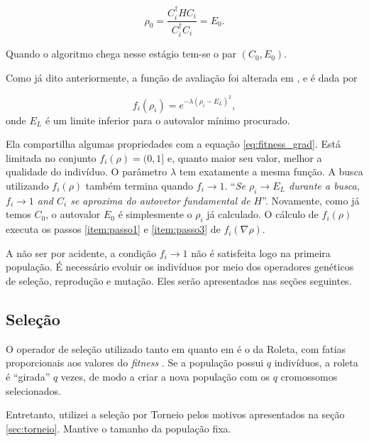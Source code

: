 	\begin{equation}
		\rho_0 = \frac{C_i^{\dagger} H C_i}{C_i^{\dagger} C_i} = E_0.
	\end{equation}
	
	Quando o algoritmo chega nesse estágio tem-se o par $(C_0,E_0)$.
	
	Como já dito anteriormente, a função de avaliação foi alterada em \cite{metodo2011}, e é dada por 
	
	\begin{equation}\label{eq:fitness_EL_metodo}
		f_i(\rho_i) = e^{-\lambda(\rho_i - E_L)^2},
	\end{equation}
	onde $E_L$ é um limite inferior para o autovalor mínimo procurado.
	
	Ela compartilha algumas propriedades com a equação \ref{eq:fitness_grad}. Está limitada no conjunto $f_i(\rho) = (0,1]$ e, quanto maior seu valor, melhor a qualidade do indivíduo. O parâmetro $\lambda$ tem exatamente a mesma função. A busca utilizando $f_i(\rho)$ também termina quando $f_i \rightarrow 1$. ``\emph{Se $\rho_i \rightarrow E_L$ durante a busca, $f_i \rightarrow 1$ and $C_i$ se aproxima do autovetor fundamental de $H$}''. Novamente, como já temos $C_0$, o autovalor $E_0$ é simplesmente o $\rho_i$ já calculado.	O cálculo de $f_i(\rho)$ executa os passos \ref{item:passo1} e \ref{item:passo3} de $f_i(\nabla\rho)$.
				
		A não ser por acidente, a condição $f_i \rightarrow 1$ não é satisfeita logo na primeira população. É necessário evoluir os indivíduos por meio dos operadores genéticos de seleção, reprodução e mutação. Eles serão apresentados nas seções seguintes.

\subsection{Seleção}

			O operador de seleção utilizado tanto em \cite{metodo2004} quanto em \cite{metodo2011} é o da Roleta, com fatias proporcionais aos valores do \emph{fitness} \cite{Linden2008}. Se a população possui $q$ indivíduos, a roleta é ``girada'' $q$ vezes, de modo a criar a nova população com os $q$ cromossomos selecionados.
			
			Entretanto, utilizei a seleção por Torneio pelos motivos apresentados na seção \ref{sec:torneio}. Mantive o tamanho da população fixa.
									

